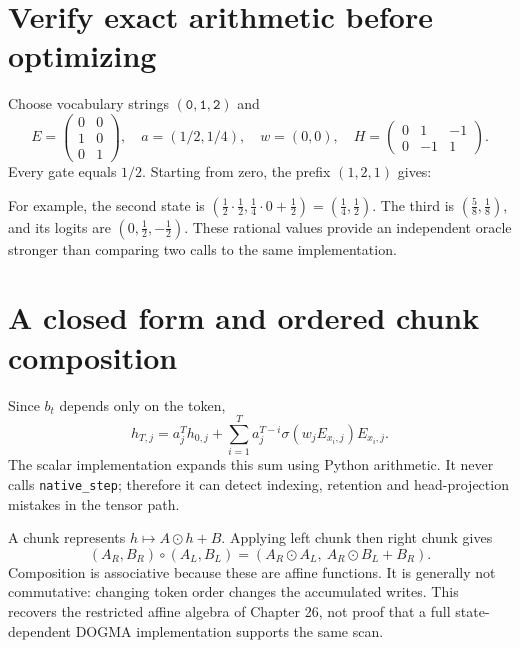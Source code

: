 \section{Verify exact arithmetic before optimizing}
Choose vocabulary strings $(\texttt{0},\texttt{1},\texttt{2})$ and
\[
 E=\begin{pmatrix}0&0\\1&0\\0&1\end{pmatrix},\quad
 a=(1/2,1/4),\quad w=(0,0),\quad
 H=\begin{pmatrix}0&1&-1\\0&-1&1\end{pmatrix}.
\]
Every gate equals $1/2$. Starting from zero, the prefix $(1,2,1)$ gives:
\begin{center}\end{center}
For example, the second state is
$(\tfrac12\cdot\tfrac12,\tfrac14\cdot0+\tfrac12)
=(\tfrac14,\tfrac12)$.
The third is $(\tfrac58,\tfrac18)$, and its logits are
$(0,\tfrac12,-\tfrac12)$.
These rational values provide an independent oracle stronger than comparing
two calls to the same implementation.

\section{A closed form and ordered chunk composition}
Since $b_t$ depends only on the token,
\begin{equation}
 h_{T,j}=a_j^T h_{0,j}+
       \sum_{i=1}^{T}a_j^{T-i}\sigma(w_jE_{x_i,j})E_{x_i,j}.
 \label{eq:evo31-closed}
\end{equation}
The scalar implementation expands this sum using Python arithmetic.
It never calls \texttt{native\_step}; therefore it can detect indexing,
retention and head-projection mistakes in the tensor path.

A chunk represents $h\mapsto A\odot h+B$. Applying left chunk then right chunk
gives
\[
 (A_R,B_R)\circ(A_L,B_L)=
 (A_R\odot A_L,\ A_R\odot B_L+B_R).
\]
Composition is associative because these are affine functions. It is generally
not commutative: changing token order changes the accumulated writes.
This recovers the restricted affine algebra of Chapter 26, not proof that a
full state-dependent DOGMA implementation supports the same scan.

